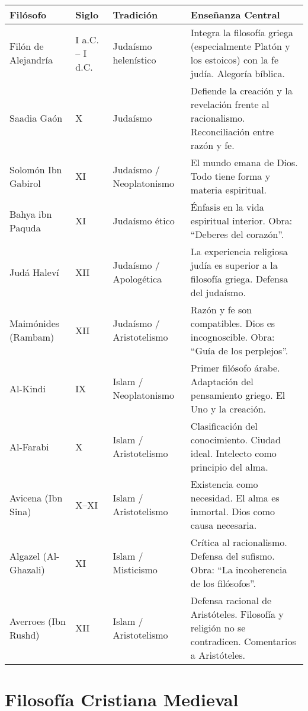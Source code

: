 \documentclass[12pt]{article}
\begin{document}
\begin{tabularx}{\textwidth}{@{} l l l X @{}}
\toprule
\textbf{Filósofo} & \textbf{Siglo} & \textbf{Tradición} & \textbf{Enseñanza Central} \\
\midrule
Filón de Alejandría & I a.C. – I d.C. & Judaísmo helenístico & Integra la filosofía griega (especialmente Platón y los estoicos) con la fe judía. Alegoría bíblica. \\
Saadia Gaón         & X              & Judaísmo             & Defiende la creación y la revelación frente al racionalismo. Reconciliación entre razón y fe. \\
Solomón Ibn Gabirol & XI             & Judaísmo / Neoplatonismo & El mundo emana de Dios. Todo tiene forma y materia espiritual. \\
Bahya ibn Paquda    & XI             & Judaísmo ético       & Énfasis en la vida espiritual interior. Obra: “Deberes del corazón”. \\
Judá Haleví          & XII            & Judaísmo / Apologética & La experiencia religiosa judía es superior a la filosofía griega. Defensa del judaísmo. \\
Maimónides (Rambam) & XII            & Judaísmo / Aristotelismo & Razón y fe son compatibles. Dios es incognoscible. Obra: “Guía de los perplejos”. \\
Al-Kindi             & IX             & Islam / Neoplatonismo & Primer filósofo árabe. Adaptación del pensamiento griego. El Uno y la creación. \\
Al-Farabi            & X              & Islam / Aristotelismo & Clasificación del conocimiento. Ciudad ideal. Intelecto como principio del alma. \\
Avicena (Ibn Sina)   & X–XI           & Islam / Aristotelismo & Existencia como necesidad. El alma es inmortal. Dios como causa necesaria. \\
Algazel (Al-Ghazali) & XI             & Islam / Misticismo   & Crítica al racionalismo. Defensa del sufismo. Obra: “La incoherencia de los filósofos”. \\
Averroes (Ibn Rushd) & XII            & Islam / Aristotelismo & Defensa racional de Aristóteles. Filosofía y religión no se contradicen. Comentarios a Aristóteles. \\
\bottomrule
\end{tabularx}

\section*{Filosofía Cristiana Medieval}
\end{document}
